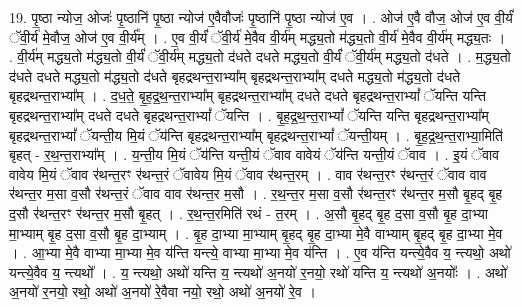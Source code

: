 \documentclass[17pt]{extarticle}
\begin{document}
19. पृ॒ष्ठा न्योज॒ ओजः॑ पृ॒ष्ठानि॑ पृ॒ष्ठा न्योज॑ ए॒वैवौजः॑ पृ॒ष्ठानि॑ पृ॒ष्ठा न्योज॑ ए॒व । . ओज॑ ए॒वै वौज॒ ओज॑ ए॒व वी॒र्यं॑ ॅवी॒र्य॑ मे॒वौज॒ ओज॑ ए॒व वी॒र्य᳚म् । . ए॒व वी॒र्यं॑ ॅवी॒र्य॑ मे॒वैव वी॒र्य॑म् मद्ध्य॒तो म॑द्ध्य॒तो वी॒र्य॑ मे॒वैव वी॒र्य॑म् मद्ध्य॒तः । . वी॒र्य॑म् मद्ध्य॒तो म॑द्ध्य॒तो वी॒र्यं॑ ॅवी॒र्य॑म् मद्ध्य॒तो द॑धते दधते मद्ध्य॒तो वी॒र्यं॑ ॅवी॒र्य॑म् मद्ध्य॒तो द॑धते । . म॒द्ध्य॒तो द॑धते दधते मद्ध्य॒तो म॑द्ध्य॒तो द॑धते बृहद्रथन्त॒राभ्या᳚म् बृहद्रथन्त॒राभ्या᳚म् दधते मद्ध्य॒तो म॑द्ध्य॒तो द॑धते बृहद्रथन्त॒राभ्या᳚म् । . द॒ध॒ते॒ बृ॒ह॒द्र॒थ॒न्त॒राभ्या᳚म् बृहद्रथन्त॒राभ्या᳚म् दधते दधते बृहद्रथन्त॒राभ्यां᳚ ॅयन्ति यन्ति बृहद्रथन्त॒राभ्या᳚म् दधते दधते बृहद्रथन्त॒राभ्यां᳚ ॅयन्ति । . बृ॒ह॒द्र॒थ॒न्त॒राभ्यां᳚ ॅयन्ति यन्ति बृहद्रथन्त॒राभ्या᳚म् बृहद्रथन्त॒राभ्यां᳚ ॅयन्ती॒य मि॒यं ॅय॑न्ति बृहद्रथन्त॒राभ्या᳚म् बृहद्रथन्त॒राभ्यां᳚ ॅयन्ती॒यम् । . बृ॒ह॒द्र॒थ॒न्त॒राभ्या॒मिति॑ बृहत् - र॒थ॒न्त॒राभ्या᳚म् । . य॒न्ती॒य मि॒यं ॅय॑न्ति यन्ती॒यं ॅवाव वावेयं ॅय॑न्ति यन्ती॒यं ॅवाव । . इ॒यं ॅवाव वावेय मि॒यं ॅवाव र॑थन्त॒रꣳ र॑थन्त॒रं ॅवावेय मि॒यं ॅवाव र॑थन्त॒रम् । . वाव र॑थन्त॒रꣳ र॑थन्त॒रं ॅवाव वाव र॑थन्त॒र म॒सा व॒सौ र॑थन्त॒रं ॅवाव वाव र॑थन्त॒र म॒सौ । . र॒थ॒न्त॒र म॒सा व॒सौ र॑थन्त॒रꣳ र॑थन्त॒र म॒सौ बृ॒हद् बृ॒ह द॒सौ र॑थन्त॒रꣳ र॑थन्त॒र म॒सौ बृ॒हत् । . र॒थ॒न्त॒रमिति॑ रथं - त॒रम् । . अ॒सौ बृ॒हद् बृ॒ह द॒सा व॒सौ बृ॒ह दा॒भ्या मा॒भ्याम् बृ॒ह द॒सा व॒सौ बृ॒ह दा॒भ्याम् । . बृ॒ह दा॒भ्या मा॒भ्याम् बृ॒हद् बृ॒ह दा॒भ्या मे॒वै वाभ्याम् बृ॒हद् बृ॒ह दा॒भ्या मे॒व । . आ॒भ्या मे॒वै वाभ्या मा॒भ्या मे॒व य॑न्ति यन्त्ये॒ वाभ्या मा॒भ्या मे॒व य॑न्ति । . ए॒व य॑न्ति यन्त्ये॒वैव य॒ न्त्यथो॒ अथो॑ यन्त्ये॒वैव य॒ न्त्यथो᳚ । . य॒ न्त्यथो॒ अथो॑ यन्ति य॒ न्त्यथो॑ अ॒नयो॑ र॒नयो॒ रथो॑ यन्ति य॒ न्त्यथो॑ अ॒नयोः᳚ । . अथो॑ अ॒नयो॑ र॒नयो॒ रथो॒ अथो॑ अ॒नयो॑ रे॒वैवा नयो॒ रथो॒ अथो॑ अ॒नयो॑ रे॒व । \newline
\end{document}
